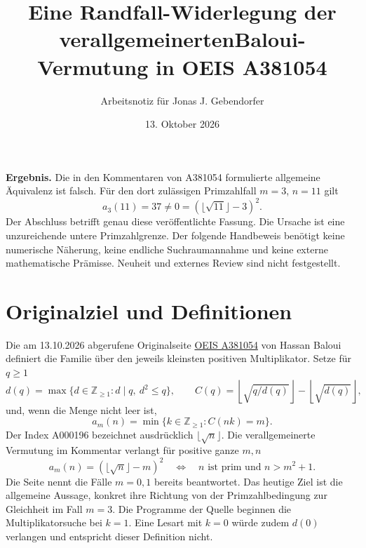 \documentclass[11pt,a4paper]{article}
\title{Eine Randfall-Widerlegung der verallgemeinerten\newline Baloui-Vermutung in OEIS A381054}
\author{Arbeitsnotiz für Jonas J. Gebendorfer}
\date{13. Oktober 2026}
\begin{document}
\maketitle
\noindent\textbf{Ergebnis.} Die in den Kommentaren von A381054 formulierte allgemeine
Äquivalenz ist falsch. Für den dort zulässigen Primzahlfall $m=3$, $n=11$ gilt
\[
 a_3(11)=37\ne 0=(\lfloor\sqrt{11}\rfloor-3)^2.
\]
Der Abschluss betrifft genau diese veröffentlichte Fassung. Die Ursache ist eine
unzureichende untere Primzahlgrenze. Der folgende Handbeweis benötigt keine
numerische Näherung, keine endliche Suchraumannahme und keine externe mathematische
Prämisse. Neuheit und externes Review sind nicht festgestellt.

\section{Originalziel und Definitionen}
Die am 13.10.2026 abgerufene Originalseite \href{https://oeis.org/A381054}{OEIS A381054}
von Hassan Baloui definiert die Familie über den jeweils kleinsten positiven
Multiplikator. Setze für $q\ge1$
\[
 d(q)=\max\{d\in\mathbb Z_{\ge1}:d\mid q,\ d^2\le q\},\qquad
 C(q)=\left\lfloor\sqrt{q/d(q)}\right\rfloor-\left\lfloor\sqrt{d(q)}\right\rfloor,
\]
und, wenn die Menge nicht leer ist,
\[
 a_m(n)=\min\{k\in\mathbb Z_{\ge1}:C(nk)=m\}.
\]
Der Index A000196 bezeichnet ausdrücklich $\lfloor\sqrt n\rfloor$.
Die verallgemeinerte Vermutung im Kommentar verlangt für positive ganze $m,n$
\begin{equation}\label{original}
 a_m(n)=(\lfloor\sqrt n\rfloor-m)^2
 \quad\Longleftrightarrow\quad
 n\text{ ist prim und }n>m^2+1.
\end{equation}
Die Seite nennt die Fälle $m=0,1$ bereits beantwortet. Das heutige Ziel ist die
allgemeine Aussage, konkret ihre Richtung von der Primzahlbedingung zur Gleichheit
im Fall $m=3$. Die Programme der Quelle beginnen die Multiplikatorsuche bei $k=1$.
Eine Lesart mit $k=0$ würde zudem $d(0)$ verlangen und entspricht dieser Definition nicht.
\end{document}

